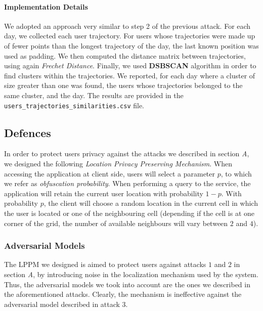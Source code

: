\documentclass[10pt,conference,compsocconf]{IEEEtran}
\begin{document}
\paragraph{Implementation Details}
We adopted an approach very similar to step 2 of the previous attack. For each
day, we collected each user trajectory. For users whose trajectories were made
up of fewer points than the longest trajectory of the day, the last known
position was used as padding. We then computed the distance matrix between
trajectories, using again \textit{Frechet Distance}. Finally, we used
\textbf{DSBSCAN} algorithm in order to find clusters within the trajectories. We
reported, for each day where a cluster of size greater than one was found, the
users whose trajectories belonged to the same cluster, and the day. The results
are provided in the \texttt{users\_trajectories\_similarities.csv} file.


\subsection{Defences}
In order to protect users privacy against the attacks we described in section
\textit{A}, we designed the following \textit{Location Privacy Preserving
Mechanism}. When accessing the application at client side, users will select a
parameter $p$, to which we refer as \textit{obfuscation probability}. When
performing a query to the service, the application will retain the current user
location with probability $1-p$. With probability $p$, the client will choose a
random location in the current cell in which the user is located or one of the
neighbouring cell (depending if the cell is at one corner of the grid, the
number of available neighbours will vary between $2$ and $4$).
\subsubsection{Adversarial Models}
The LPPM we designed is aimed to protect users against attacks $1$ and $2$ in
section \textit{A}, by introducing noise in the localization mechanism used by
the system. Thus, the adversarial models we took into account are the ones we
described in the aforementioned attacks. Clearly, the mechanism is ineffective
against the adversarial model described in attack $3$.
\end{document}

